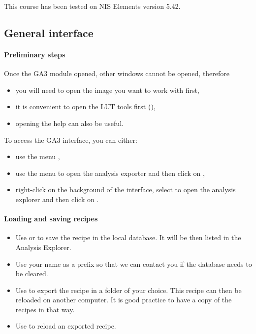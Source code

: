 
This course has been tested on NIS Elements version 5.42.

\subsection{General interface}


\paragraph{Preliminary steps}
Once the GA3 module opened, other windows cannot be opened, therefore
\begin{itemize}
  \item you will need to open the image you want to work with first,
  \item it is convenient to open the LUT tools first (),
  \item opening the help  can also be useful.
\end{itemize}
To access the GA3 interface, you can either:
\begin{itemize}
  \item use the menu ,
  \item use the menu  to open the analysis exporter and then click on ,
  \item right-click on the background of the interface, select  to open the analysis explorer and then click on .
\end{itemize}

\paragraph{Loading and saving recipes}

\begin{itemize}
  \item Use  or  to save the recipe in the local database. It will be then listed in the Analysis Explorer.
  \item Use your name as a prefix so that we can contact you if the database needs to be cleared.
  \item Use  to export the recipe in a folder of your choice. This recipe can then be reloaded on another computer. It is good practice to have a copy of the recipes in that way.
  \item Use  to reload an exported recipe.
\end{itemize}

